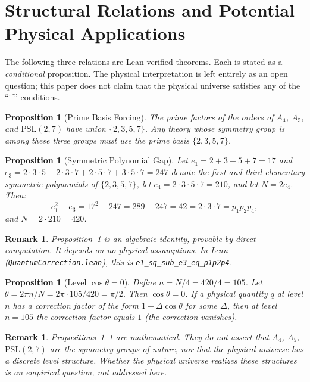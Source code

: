 ﻿\documentclass[11pt]{article}
\newtheorem{proposition}[theorem]{Proposition}
\newtheorem{remark}[theorem]{Remark}
\begin{document}
\section{Structural Relations and Potential Physical Applications}
\label{sec:relations}

The following three relations are Lean-verified theorems.
Each is stated as a \emph{conditional} proposition. The
physical interpretation is left entirely as an open
question; this paper does not claim that the physical
universe satisfies any of the ``if'' conditions.

\begin{proposition}[Prime Basis Forcing]
\label{prop:forcing}
The prime factors of the orders of $A_4$, $A_5$, and
$\mathrm{PSL}(2,7)$ have union $\{2,3,5,7\}$. Any theory
whose symmetry group is among these three groups must use
the prime basis $\{2,3,5,7\}$.
\end{proposition}

\begin{proposition}[Symmetric Polynomial Gap]
\label{prop:gap}
Let $e_1 = 2+3+5+7 = 17$ and $e_3 = 2 \cdot 3 \cdot 5
+ 2 \cdot 3 \cdot 7 + 2 \cdot 5 \cdot 7 + 3 \cdot 5 \cdot 7
= 247$ denote the first and third elementary symmetric
polynomials of $\{2,3,5,7\}$, let $e_4 = 2 \cdot 3 \cdot
5 \cdot 7 = 210$, and let $N = 2 e_4$. Then:
\[
e_1^2 - e_3 = 17^2 - 247 = 289 - 247 = 42
= 2 \cdot 3 \cdot 7 = p_1 p_2 p_4,
\]
and $N = 2 \cdot 210 = 420$.
\end{proposition}

\begin{remark}
Proposition~\ref{prop:gap} is an algebraic identity,
provable by direct computation. It depends on no physical
assumptions. In Lean (\texttt{QuantumCorrection.lean}),
this is \texttt{e1\_sq\_sub\_e3\_eq\_p1p2p4}.
\end{remark}

\begin{proposition}[Level $\cos\theta = 0$]
\label{prop:cos}
Define $n = N/4 = 420/4 = 105$. Let $\theta = 2\pi n / N
= 2\pi \cdot 105 / 420 = \pi/2$. Then $\cos\theta = 0$.
If a physical quantity $q$ at level $n$ has a correction
factor of the form $1 + \Delta \cos\theta$ for some
$\Delta$, then at level $n = 105$ the correction factor
equals $1$ (the correction vanishes).
\end{proposition}

\begin{remark}
Propositions~\ref{prop:forcing}--\ref{prop:cos} are
mathematical. They do not assert that $A_4$, $A_5$,
$\mathrm{PSL}(2,7)$ are the symmetry groups of nature,
nor that the physical universe has a discrete level
structure. Whether the physical universe realizes these
structures is an empirical question, not addressed here.
\end{remark}
\end{document}
